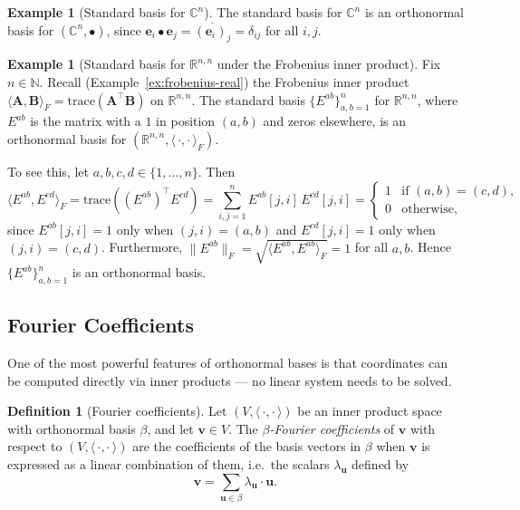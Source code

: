 \documentclass[11pt, a4paper, notitlepage]{report}
\theoremstyle{definition}
\newtheorem{definition}[theorem]{Definition}
\newtheorem{example}[theorem]{Example}
\theoremstyle{remark}
\begin{document}
\begin{example}[Standard basis for $\mathbb{C}^n$]
\label{ex:ONB-Cn}
The standard basis for $\mathbb{C}^n$ is an orthonormal basis for $(\mathbb{C}^n,\bullet)$,
since $\mathbf{e}_i\bullet\mathbf{e}_j = \overline{(\mathbf{e}_i)_j} = \delta_{ij}$ for all $i,j$.
\end{example}

\begin{example}[Standard basis for $\mathbb{R}^{n,n}$ under the Frobenius inner product]
\label{ex:ONB-Rnn}
Fix $n\in\mathbb{N}$. Recall (Example~\ref{ex:frobenius-real}) the Frobenius inner product
$\langle\mathbf{A},\mathbf{B}\rangle_F = \mathrm{trace}(\mathbf{A}^\top\mathbf{B})$ on
$\mathbb{R}^{n,n}$.
The standard basis $\{E^{ab}\}_{a,b=1}^n$ for $\mathbb{R}^{n,n}$, where $E^{ab}$ is the matrix
with a $1$ in position $(a,b)$ and zeros elsewhere, is an orthonormal basis for
$(\mathbb{R}^{n,n},\langle\,\cdot,\cdot\,\rangle_F)$.

To see this, let $a,b,c,d\in\{1,\ldots,n\}$. Then
\[
  \langle E^{ab}, E^{cd}\rangle_F
  = \mathrm{trace}((E^{ab})^\top E^{cd})
  = \sum_{i,j=1}^n E^{ab}[j,i]\,E^{cd}[j,i]
  = \begin{cases} 1 & \text{if }(a,b)=(c,d), \\ 0 & \text{otherwise,}\end{cases}
\]
since $E^{ab}[j,i] = 1$ only when $(j,i)=(a,b)$ and $E^{cd}[j,i]=1$ only when $(j,i)=(c,d)$.
Furthermore, $\|E^{ab}\|_F = \sqrt{\langle E^{ab},E^{ab}\rangle_F} = 1$ for all $a,b$.
Hence $\{E^{ab}\}_{a,b=1}^n$ is an orthonormal basis.
\end{example}

\subsection{Fourier Coefficients}
\label{subsec:fourier-coeffs}

One of the most powerful features of orthonormal bases is that coordinates can be
computed directly via inner products — no linear system needs to be solved.

\begin{definition}[Fourier coefficients]
\label{def:fourier-coeffs}
Let $(V,\langle\,\cdot,\cdot\,\rangle)$ be an inner product space with orthonormal basis $\beta$,
and let $\mathbf{v}\in V$.
The \emph{$\beta$-Fourier coefficients} of $\mathbf{v}$ with respect to $(V,\langle\,\cdot,\cdot\,\rangle)$
are the coefficients of the basis vectors in $\beta$ when $\mathbf{v}$ is expressed as a
linear combination of them, i.e.\ the scalars $\lambda_{\mathbf{u}}$ defined by
\[
  \mathbf{v} = \sum_{\mathbf{u}\in\beta}\lambda_{\mathbf{u}}\cdot\mathbf{u}.
\]
\end{definition}
\end{document}
